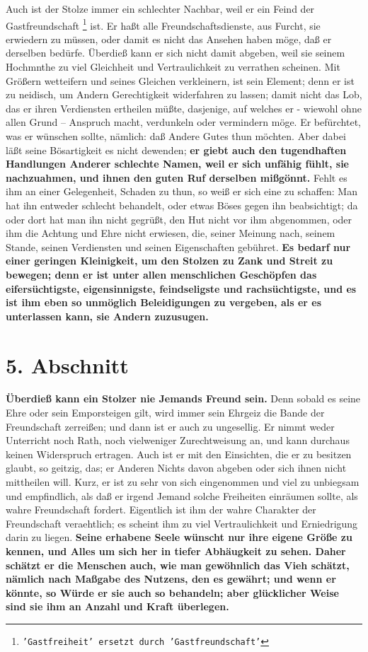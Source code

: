 Auch ist der Stolze immer ein schlechter Nachbar, weil er ein Feind der
Gastfreundschaft
\footnote{\texttt{'Gastfreiheit' ersetzt durch 'Gastfreundschaft'}}
 ist. Er haßt alle
Freundschaftsdienste, aus Furcht, sie erwiedern
zu müssen, oder damit es nicht das Ansehen haben möge, daß er derselben bedürfe.
Überdieß kann er sich nicht damit abgeben, weil sie seinem Hochmnthe zu viel
Gleichheit und Vertraulichkeit zu verrathen scheinen. Mit
Größern wetteifern und
seines Gleichen verkleinern, ist sein Element; denn er ist zu neidisch, um
Andern Gerechtigkeit widerfahren zu lassen; damit nicht das Lob, das
er ihren
Verdiensten ertheilen müßte, dasjenige, auf welches er - wiewohl ohne allen
Grund -- Anspruch macht, verdunkeln oder vermindern möge. Er befürchtet, was er
wünschen sollte, nämlich: daß Andere Gutes thun möchten. Aber dabei läßt seine
Bösartigkeit es nicht dewenden; \textbf{er giebt auch den tugendhaften
Handlungen
Anderer schlechte Namen, weil er sich unfähig fühlt, sie nachzuahmen, und ihnen
den guten Ruf derselben mißgönnt.} Fehlt es ihm an einer Gelegenheit, Schaden zu
thun, so weiß er sich eine zu schaffen: Man hat ihn entweder schlecht behandelt,
oder etwas Böses gegen ihn beabsichtigt; da oder dort hat man ihn nicht gegrüßt,
den Hut nicht vor ihm abgenommen, oder ihm die Achtung und Ehre nicht erwiesen,
die, seiner Meinung nach, seinem Stande, seinen Verdiensten und seinen
Eigenschaften gebühret. \textbf{Es bedarf nur einer geringen Kleinigkeit, um den
Stolzen
zu Zank und Streit zu bewegen; denn er ist unter allen
menschlichen Geschöpfen
das eifersüchtigste, eigensinnigste, feindseligste und rachsüchtigste, und es
ist ihm eben so unmöglich Beleidigungen zu vergeben, als er es unterlassen kann,
sie Andern zuzusugen.}

\section{5. Abschnitt} \label{kap12_ab5}

\textbf{Überdieß kann ein Stolzer nie Jemands Freund sein.} Denn sobald es seine
Ehre
oder sein Emporsteigen gilt, wird immer sein Ehrgeiz die Bande der Freundschaft
zerreißen; und dann ist er auch zu ungesellig. Er nimmt weder Unterricht noch
Rath, noch vielweniger Zurechtweisung an, und kann
durchaus keinen Widerspruch
ertragen. Auch ist er mit den Einsichten, die er zu besitzen glaubt, so geitzig,
das; er Anderen Nichts davon abgeben oder sich ihnen nicht mittheilen will.
Kurz, er ist zu sehr von sich eingenommen und viel zu unbiegsam und empfindlich,
als daß er irgend Jemand solche Freiheiten einräumen sollte, als wahre
Freundschaft fordert. Eigentlich ist ihm der wahre Charakter der Freundschaft
veraehtlich; es scheint ihm zu viel Vertraulichkeit und Erniedrigung darin zu
liegen. \textbf{Seine erhabene Seele wünscht nur ihre eigene Größe zu kennen,
und Alles
um sich her in tiefer Abhäugkeit zu sehen. Daher schätzt er die Menschen auch,
wie man gewöhnlich das Vieh schätzt, nämlich nach Maßgabe des Nutzens, den es
gewährt; und wenn er könnte, so Würde er sie auch so behandeln; aber glücklicher
Weise sind sie ihm an Anzahl und Kraft überlegen.}


